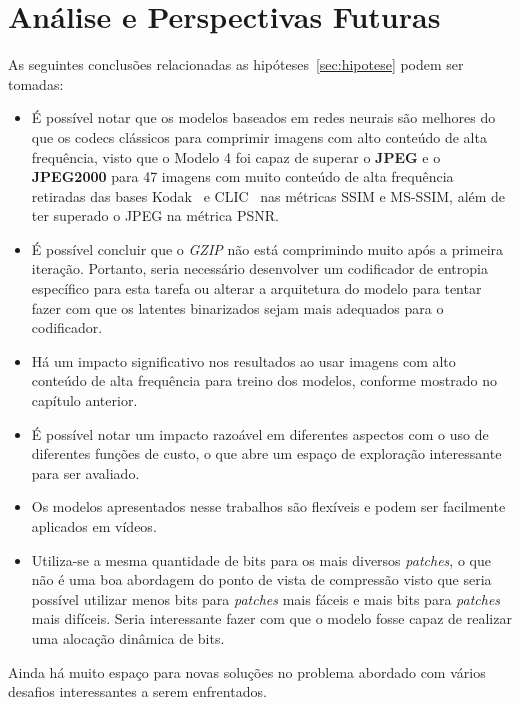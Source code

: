 \section{Análise e Perspectivas Futuras}
\label{sec:analise}
As seguintes conclusões relacionadas as hipóteses~\ref{sec:hipotese} podem ser tomadas:
\begin{itemize}
    \item É possível notar que os modelos baseados em redes neurais são melhores do que os codecs clássicos para comprimir imagens com alto conteúdo de alta frequência, visto que o Modelo 4 foi capaz de superar o \textbf{JPEG} e o \textbf{JPEG2000} para 47 imagens com muito conteúdo de alta frequência retiradas das bases Kodak~\cite{kodak} e CLIC~\cite{clic} nas métricas \acrshort{SSIM} e \acrshort{MS-SSIM}, além de ter superado o \acrshort{JPEG} na métrica \acrshort{PSNR}.
    \item É possível concluir que o \textit{GZIP} não está comprimindo muito após a primeira iteração. Portanto, seria necessário desenvolver um codificador de entropia específico para esta tarefa ou alterar a      arquitetura do modelo para tentar fazer com que os latentes binarizados sejam mais adequados para o codificador.
    \item Há um impacto significativo nos resultados ao usar imagens com alto conteúdo de alta frequência para treino dos modelos, conforme mostrado no capítulo anterior. 
    \item É possível notar um impacto razoável em diferentes aspectos com o uso de diferentes funções de custo, o que abre um espaço de exploração interessante para ser avaliado.
    \item Os modelos apresentados nesse trabalhos são flexíveis e podem ser facilmente aplicados em vídeos.
    \item Utiliza-se a mesma quantidade de bits para os mais diversos \textit{patches}, o que não é uma boa abordagem do ponto de vista de compressão visto que seria possível utilizar menos bits para \textit{patches} mais fáceis e mais bits para \textit{patches} mais difíceis. Seria interessante fazer com que o modelo fosse capaz de realizar uma alocação dinâmica de bits.
\end{itemize}

Ainda há muito espaço para novas soluções no problema abordado com vários desafios interessantes a serem enfrentados.

